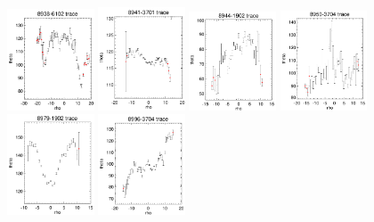\documentclass[fleqn,usenatbib]{mnras}
\begin{document}
\begin{figure}
    \centering
    \includegraphics[width=0.23\textwidth]{Images/SN1-MC250/CPSBs/8938-6102-1-250.png}
    \includegraphics[width=0.23\textwidth]{Images/SN1-MC250/CPSBs/8941-3701-1-250.png}
    \includegraphics[width=0.23\textwidth]{Images/SN1-MC250/CPSBs/8944-1902-1-250.png}
    \includegraphics[width=0.23\textwidth]{Images/SN1-MC250/CPSBs/8950-3704-1-250.png}
    \includegraphics[width=0.23\textwidth]{Images/SN1-MC250/CPSBs/8979-1902-1-250.png}
    \includegraphics[width=0.23\textwidth]{Images/SN1-MC250/CPSBs/8996-3704-1-250.png}

\end{figure}
\end{document}
